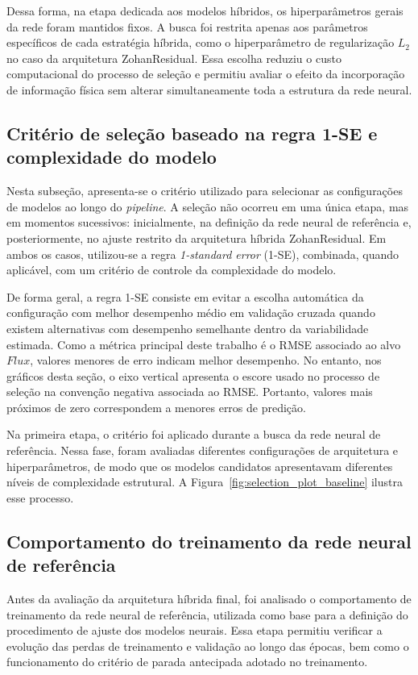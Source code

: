 Dessa forma, na etapa dedicada aos modelos híbridos, os hiperparâmetros gerais da rede foram mantidos fixos. A busca foi restrita apenas aos parâmetros específicos de cada estratégia híbrida, como o hiperparâmetro de regularização $L_2$ no caso da arquitetura ZohanResidual. Essa escolha reduziu o custo computacional do processo de seleção e permitiu avaliar o efeito da incorporação de informação física sem alterar simultaneamente toda a estrutura da rede neural.

\subsection{Critério de seleção baseado na regra 1-SE e complexidade do modelo}

Nesta subseção, apresenta-se o critério utilizado para selecionar as configurações de modelos ao longo do \textit{pipeline}. A seleção não ocorreu em uma única etapa, mas em momentos sucessivos: inicialmente, na definição da rede neural de referência e, posteriormente, no ajuste restrito da arquitetura híbrida ZohanResidual. Em ambos os casos, utilizou-se a regra \textit{1-standard error} (1-SE), combinada, quando aplicável, com um critério de controle da complexidade do modelo.

De forma geral, a regra 1-SE consiste em evitar a escolha automática da configuração com melhor desempenho médio em validação cruzada quando existem alternativas com desempenho semelhante dentro da variabilidade estimada. Como a métrica principal deste trabalho é o RMSE associado ao alvo $Flux$, valores menores de erro indicam melhor desempenho. No entanto, nos gráficos desta seção, o eixo vertical apresenta o escore usado no processo de seleção na convenção negativa associada ao RMSE. Portanto, valores mais próximos de zero correspondem a menores erros de predição.

Na primeira etapa, o critério foi aplicado durante a busca da rede neural de referência. Nessa fase, foram avaliadas diferentes configurações de arquitetura e hiperparâmetros, de modo que os modelos candidatos apresentavam diferentes níveis de complexidade estrutural. A Figura~\ref{fig:selection_plot_baseline} ilustra esse processo.

\subsection{Comportamento do treinamento da rede neural de referência}

Antes da avaliação da arquitetura híbrida final, foi analisado o comportamento de treinamento da rede neural de referência, utilizada como base para a definição do procedimento de ajuste dos modelos neurais. Essa etapa permitiu verificar a evolução das perdas de treinamento e validação ao longo das épocas, bem como o funcionamento do critério de parada antecipada adotado no treinamento.


